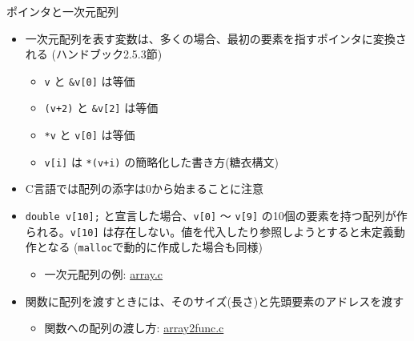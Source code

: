 \begin{frame}[t,fragile]{ポインタと一次元配列}
  \begin{itemize}
  \item 一次元配列を表す変数は、多くの場合、最初の要素を指すポインタに変換される (ハンドブック2.5.3節)
    \begin{itemize}
    \item \verb+v+ と \verb+&v[0]+ は等価
    \item \verb^(v+2)^ と \verb^&v[2]^ は等価
    \item \verb^*v^ と \verb^v[0]^ は等価
    \item \verb^v[i]^ は \verb^*(v+i)^ の簡略化した書き方(糖衣構文)
    \end{itemize}
  \item C言語では配列の添字は0から始まることに注意
  \item \verb^double v[10];^ と宣言した場合、\verb^v[0]^ 〜 \verb^v[9]^ の10個の要素を持つ配列が作られる。\verb^v[10]^ は存在しない。値を代入したり参照しようとすると未定義動作となる (\verb^malloc^で動的に作成した場合も同様)
    \begin{itemize}
    \item 一次元配列の例: \href{https://github.com/todo-group/computer-experiments/blob/master/exercise/basics/array.c}{array.c}
    \end{itemize}
  \item 関数に配列を渡すときには、そのサイズ(長さ)と先頭要素のアドレスを渡す
    \begin{itemize}
    \item 関数への配列の渡し方: \href{https://github.com/todo-group/computer-experiments/blob/master/exercise/basics/array2func.c}{array2func.c}
    \end{itemize}
  \end{itemize}
\end{frame}
